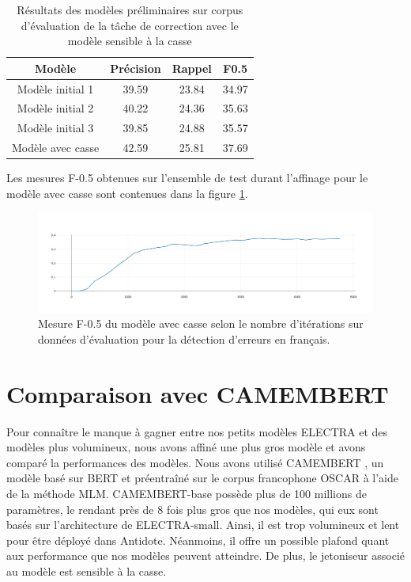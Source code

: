 \documentclass[12pt,twoside,maitrise]{dms}
\theoremstyle{definition}
\numberwithin{equation}{section}
\numberwithin{table}{chapter}
\numberwithin{figure}{chapter}
\begin{document}
\begin{table}
	\centering
	\begin{tabular}{||c | c | c | c||}
		\hline
		Modèle            & Précision & Rappel & F0.5  \\ [0.5ex]
		\hline\hline
		Modèle initial 1  & 39.59     & 23.84  & 34.97 \\
		Modèle initial 2  & 40.22     & 24.36  & 35.63 \\
		Modèle initial 3  & 39.85     & 24.88  & 35.57 \\
		Modèle avec casse & 42.59     & 25.81  & 37.69 \\
		\hline
	\end{tabular}
	\caption{Résultats des modèles préliminaires sur corpus d'évaluation de la tâche de correction avec le modèle sensible à la casse}
	\label{table:resaffinagecasse}
\end{table}

Les mesures F-0.5 obtenues sur l'ensemble de test durant l'affinage pour le
modèle avec casse sont contenues dans la figure \ref{fig:f05electraaveccasse}.
\begin{figure}
	\begin{center}
		\includegraphics[width=1.0\textwidth]{figures/electraaveccassef05.png}
	\end{center}
	\caption{Mesure F-0.5 du modèle avec casse selon le nombre d'itérations sur
		données d'évaluation pour la détection d'erreurs en
		français.}\label{fig:f05electraaveccasse}
\end{figure}

\section{Comparaison avec CAMEMBERT}
Pour connaître le manque à gagner entre nos petits modèles ELECTRA et des
modèles plus volumineux, nous avons affiné une plus gros modèle et avons
comparé la performances des modèles. Nous avons utilisé CAMEMBERT
\cite{camembert}, un modèle basé sur BERT et préentraîné sur le corpus
francophone OSCAR \cite{oscar} à l'aide de la méthode MLM. CAMEMBERT-base
possède plus de 100 millions de paramètres, le rendant près de 8 fois plus gros
que nos modèles, qui eux sont basés sur l'architecture de ELECTRA-small. Ainsi,
il est trop volumineux et lent pour être déployé dans Antidote. Néanmoins, il
offre un possible plafond quant aux performance que nos modèles peuvent
atteindre. De plus, le jetoniseur associé au modèle est sensible à la casse. \\
\end{document}
